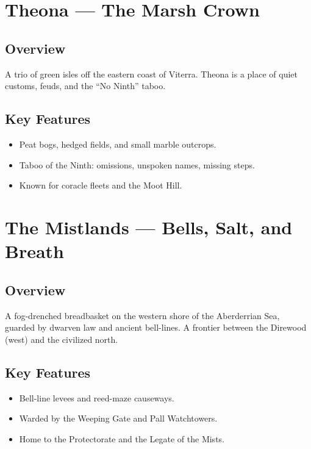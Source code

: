 \section{Theona — The Marsh Crown}
\label{sec:lore-theona}

\subsection*{Overview}
A trio of green isles off the eastern coast of Viterra. Theona is a place of quiet customs, feuds, and the “No Ninth” taboo.

\subsection*{Key Features}
\begin{itemize}[leftmargin=*]
    \item Peat bogs, hedged fields, and small marble outcrops.
    \item Taboo of the Ninth: omissions, unspoken names, missing steps.
    \item Known for coracle fleets and the Moot Hill.
\end{itemize}

\section{The Mistlands — Bells, Salt, and Breath}
\label{sec:lore-mistlands}

\subsection*{Overview}
A fog-drenched breadbasket on the western shore of the Aberderrian Sea, guarded by dwarven law and ancient bell-lines. A frontier between the Direwood (west) and the civilized north.

\subsection*{Key Features}
\begin{itemize}[leftmargin=*]
    \item Bell-line levees and reed-maze causeways.
    \item Warded by the Weeping Gate and Pall Watchtowers.
    \item Home to the Protectorate and the Legate of the Mists.
\end{itemize}


